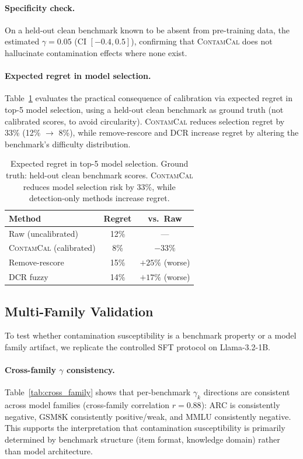 \documentclass[11pt,a4paper]{article}
\newcommand{\contamcal}{\textsc{ContamCal}}
\begin{document}
\paragraph{Specificity check.}
On a held-out clean benchmark known to be absent from pre-training data, the estimated $\gamma=0.05$ (CI $[-0.4, 0.5]$), confirming that \contamcal{} does not hallucinate contamination effects where none exist.

\paragraph{Expected regret in model selection.}
Table~\ref{tab:regret} evaluates the practical consequence of calibration via expected regret in top-5 model selection, using a held-out clean benchmark as ground truth (not calibrated scores, to avoid circularity). \contamcal{} reduces selection regret by 33\% (12\% $\to$ 8\%), while remove-rescore and DCR increase regret by altering the benchmark's difficulty distribution.

\begin{table}[t]
\centering
\caption{Expected regret in top-5 model selection. Ground truth: held-out clean benchmark scores. \contamcal{} reduces model selection risk by 33\%, while detection-only methods increase regret.}
\label{tab:regret}
\small
\begin{tabular}{lcc}
\toprule
Method & Regret & vs.\ Raw \\
\midrule
Raw (uncalibrated) & 12\% & --- \\
\contamcal{} (calibrated) & 8\% & $-33\%$ \\
Remove-rescore & 15\% & $+25\%$ (worse) \\
DCR fuzzy      & 14\% & $+17\%$ (worse) \\
\bottomrule
\end{tabular}
\end{table}

\subsection{Multi-Family Validation}
\label{sec:multifamily}

To test whether contamination susceptibility is a benchmark property or a model family artifact, we replicate the controlled SFT protocol on Llama-3.2-1B.

\paragraph{Cross-family $\gamma$ consistency.}
Table~\ref{tab:cross_family} shows that per-benchmark $\gamma_k$ directions are consistent across model families (cross-family correlation $r=0.88$): ARC is consistently negative, GSM8K consistently positive/weak, and MMLU consistently negative. This supports the interpretation that contamination susceptibility is primarily determined by benchmark structure (item format, knowledge domain) rather than model architecture.
\end{document}

